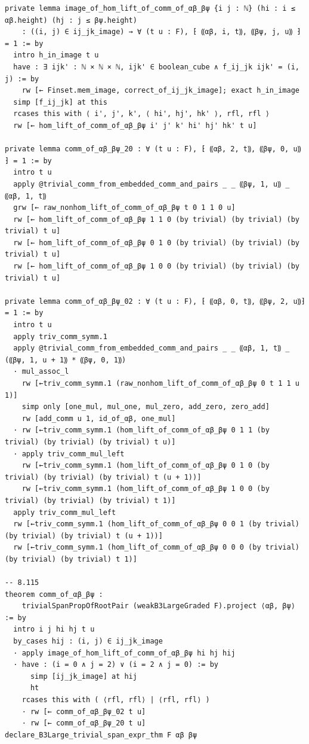 \documentclass[10pt,a4paper]{article}
\begin{document}
\begin{Verbatim}
private lemma image_of_hom_lift_of_comm_of_αβ_βψ {i j : ℕ} (hi : i ≤ αβ.height) (hj : j ≤ βψ.height)
    : ((i, j) ∈ ij_jk_image) → ∀ (t u : F), ⁅ ⸨αβ, i, t⸩, ⸨βψ, j, u⸩ ⁆ = 1 := by
  intro h_in_image t u
  have : ∃ ijk' : ℕ × ℕ × ℕ, ijk' ∈ boolean_cube ∧ f_ij_jk ijk' = (i, j) := by
    rw [← Finset.mem_image, correct_of_ij_jk_image]; exact h_in_image
  simp [f_ij_jk] at this
  rcases this with ⟨ i', j', k', ⟨ hi', hj', hk' ⟩, rfl, rfl ⟩
  rw [← hom_lift_of_comm_of_αβ_βψ i' j' k' hi' hj' hk' t u]

private lemma comm_of_αβ_βψ_20 : ∀ (t u : F), ⁅ ⸨αβ, 2, t⸩, ⸨βψ, 0, u⸩ ⁆ = 1 := by
  intro t u
  apply @trivial_comm_from_embedded_comm_and_pairs _ _ ⸨βψ, 1, u⸩ _ ⸨αβ, 1, t⸩
  grw [← raw_nonhom_lift_of_comm_of_αβ_βψ t 0 1 1 0 u]
  rw [← hom_lift_of_comm_of_αβ_βψ 1 1 0 (by trivial) (by trivial) (by trivial) t u]
  rw [← hom_lift_of_comm_of_αβ_βψ 0 1 0 (by trivial) (by trivial) (by trivial) t u]
  rw [← hom_lift_of_comm_of_αβ_βψ 1 0 0 (by trivial) (by trivial) (by trivial) t u]

private lemma comm_of_αβ_βψ_02 : ∀ (t u : F), ⁅ ⸨αβ, 0, t⸩, ⸨βψ, 2, u⸩⁆ = 1 := by
  intro t u
  apply triv_comm_symm.1
  apply @trivial_comm_from_embedded_comm_and_pairs _ _ ⸨αβ, 1, t⸩ _ (⸨βψ, 1, u + 1⸩ * ⸨βψ, 0, 1⸩)
  · mul_assoc_l
    rw [←triv_comm_symm.1 (raw_nonhom_lift_of_comm_of_αβ_βψ 0 t 1 1 u 1)]
    simp only [one_mul, mul_one, mul_zero, add_zero, zero_add]
    rw [add_comm u 1, id_of_αβ, one_mul]
  · rw [←triv_comm_symm.1 (hom_lift_of_comm_of_αβ_βψ 0 1 1 (by trivial) (by trivial) (by trivial) t u)]
  · apply triv_comm_mul_left
    rw [←triv_comm_symm.1 (hom_lift_of_comm_of_αβ_βψ 0 1 0 (by trivial) (by trivial) (by trivial) t (u + 1))]
    rw [←triv_comm_symm.1 (hom_lift_of_comm_of_αβ_βψ 1 0 0 (by trivial) (by trivial) (by trivial) t 1)]
  apply triv_comm_mul_left
  rw [←triv_comm_symm.1 (hom_lift_of_comm_of_αβ_βψ 0 0 1 (by trivial) (by trivial) (by trivial) t (u + 1))]
  rw [←triv_comm_symm.1 (hom_lift_of_comm_of_αβ_βψ 0 0 0 (by trivial) (by trivial) (by trivial) t 1)]

-- 8.115
theorem comm_of_αβ_βψ :
    trivialSpanPropOfRootPair (weakB3LargeGraded F).project ⟨αβ, βψ⟩ := by
  intro i j hi hj t u
  by_cases hij : (i, j) ∈ ij_jk_image
  · apply image_of_hom_lift_of_comm_of_αβ_βψ hi hj hij
  · have : (i = 0 ∧ j = 2) ∨ (i = 2 ∧ j = 0) := by
      simp [ij_jk_image] at hij
      ht
    rcases this with ( ⟨rfl, rfl⟩ | ⟨rfl, rfl⟩ )
    · rw [← comm_of_αβ_βψ_02 t u]
    · rw [← comm_of_αβ_βψ_20 t u]
declare_B3Large_trivial_span_expr_thm F αβ βψ


\end{Verbatim}
\end{document}
